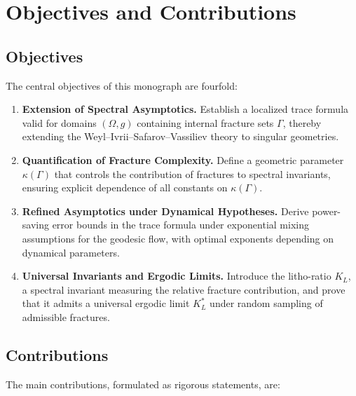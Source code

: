 \section{Objectives and Contributions}
\label{sec:intro-objectives}

\subsection{Objectives}

The central objectives of this monograph are fourfold:

\begin{enumerate}[label=\textbf{O\arabic*}]
    \item \textbf{Extension of Spectral Asymptotics.}
    Establish a localized trace formula valid for domains $(\Omega,g)$
    containing internal fracture sets $\Gamma$, thereby extending the
    Weyl--Ivrii--Safarov--Vassiliev theory to singular geometries.

    \item \textbf{Quantification of Fracture Complexity.}
    Define a geometric parameter $\kappa(\Gamma)$ that controls the
    contribution of fractures to spectral invariants, ensuring explicit
    dependence of all constants on $\kappa(\Gamma)$.

    \item \textbf{Refined Asymptotics under Dynamical Hypotheses.}
    Derive power-saving error bounds in the trace formula under
    exponential mixing assumptions for the geodesic flow, with optimal
    exponents depending on dynamical parameters.

    \item \textbf{Universal Invariants and Ergodic Limits.}
    Introduce the litho-ratio $K_L$, a spectral invariant measuring the
    relative fracture contribution, and prove that it admits a universal
    ergodic limit $K_L^*$ under random sampling of admissible fractures.
\end{enumerate}

\subsection{Contributions}

The main contributions, formulated as rigorous statements, are:

